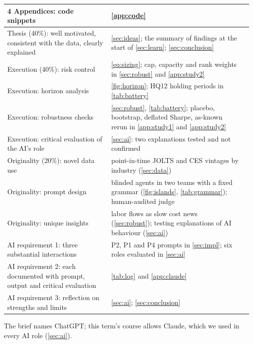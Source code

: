 \documentclass[11pt,letterpaper]{article}
\begin{document}
\begin{table}[H]
\begin{tabularx}{\textwidth}{@{}p{6.0cm} X r@{}}
4 Appendices: code snippets & \cref{app:code} & \pageref{app:code} \\
\midrule
Thesis (40\%): well motivated, consistent with the data, clearly explained & \cref{sec:ideas}; the summary of findings at the start of \cref{sec:learn}; \cref{sec:conclusion} & \pageref{sec:ideas} \\
Execution (40\%): risk control & \cref{eq:sizing}; cap, capacity and rank weights in \cref{sec:robust} and \cref{app:study2} & \pageref{eq:sizing} \\
Execution: horizon analysis & \cref{fig:horizon}; HQ12 holding periods in \cref{tab:battery} & \pageref{fig:horizon} \\
Execution: robustness checks & \cref{sec:robust}, \cref{tab:battery}; placebo, bootstrap, deflated Sharpe, as-known rerun in \cref{app:study1} and \cref{app:study2} & \pageref{tab:battery} \\
Execution: critical evaluation of the AI's role & \cref{sec:ai}: two explanations tested and not confirmed & \pageref{sec:ai} \\
Originality (20\%): novel data use & point-in-time JOLTS and CES vintages by industry (\cref{sec:data}) & \pageref{sec:data} \\
Originality: prompt design & blinded agents in two teams with a fixed grammar (\cref{fig:islands}, \cref{tab:grammar}); human-audited judge & \pageref{fig:islands} \\
Originality: unique insights & labor flows as slow cost news (\cref{sec:robust}); testing explanations of AI behaviour (\cref{sec:ai}) & \pageref{sec:ai} \\
\midrule
AI requirement 1: three substantial interactions & P2, P1 and P4 prompts in \cref{sec:impl}; six roles evaluated in \cref{sec:ai} & \pageref{sec:impl} \\
AI requirement 2: each documented with prompt, output and critical evaluation & \cref{tab:log} and \cref{app:claude} & \pageref{tab:log} \\
AI requirement 3: reflection on strengths and limits & \cref{sec:ai}; \cref{sec:conclusion} & \pageref{sec:ai} \\
\bottomrule
\end{tabularx}
\end{table}
The brief names ChatGPT; this term's course allows Claude, which we used in every
AI role (\cref{sec:ai}).
\end{document}
